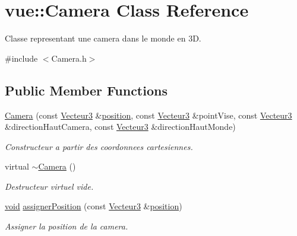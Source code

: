 \hypertarget{classvue_1_1_camera}{\section{vue\-:\-:Camera Class Reference}
\label{classvue_1_1_camera}
}


Classe representant une camera dans le monde en 3\-D.  




{\ttfamily \#include $<$Camera.\-h$>$}

\subsection*{Public Member Functions}
\begin{DoxyCompactItemize}
\item 
\hyperlink{classvue_1_1_camera_ab509d5c06a626fb3b1f6c588a5c85ce1}{Camera} (const \hyperlink{group__utilitaire_ga541aa4837ad9250d3a248dc82ee9ad4d}{Vecteur3} \&\hyperlink{fmod__codec_8h_a7d71cf36b6a2fc185ecbc89f93fa58a3}{position}, const \hyperlink{group__utilitaire_ga541aa4837ad9250d3a248dc82ee9ad4d}{Vecteur3} \&point\-Vise, const \hyperlink{group__utilitaire_ga541aa4837ad9250d3a248dc82ee9ad4d}{Vecteur3} \&direction\-Haut\-Camera, const \hyperlink{group__utilitaire_ga541aa4837ad9250d3a248dc82ee9ad4d}{Vecteur3} \&direction\-Haut\-Monde)
\begin{DoxyCompactList}\small\item\em Constructeur a partir des coordonnees cartesiennes. \end{DoxyCompactList}\item 
virtual \hyperlink{classvue_1_1_camera_a173cf3a9d91b30cadd21d72149df4504}{$\sim$\-Camera} ()
\begin{DoxyCompactList}\small\item\em Destructeur virtuel vide. \end{DoxyCompactList}\item 
\hyperlink{wglew_8h_aeea6e3dfae3acf232096f57d2d57f084}{void} \hyperlink{classvue_1_1_camera_aafd52e5bb78da96244421525058eef2f}{assigner\-Position} (const \hyperlink{group__utilitaire_ga541aa4837ad9250d3a248dc82ee9ad4d}{Vecteur3} \&\hyperlink{fmod__codec_8h_a7d71cf36b6a2fc185ecbc89f93fa58a3}{position})
\begin{DoxyCompactList}\small\item\em Assigner la position de la camera. \end{DoxyCompactList}\item 

\end{DoxyCompactItemize}
